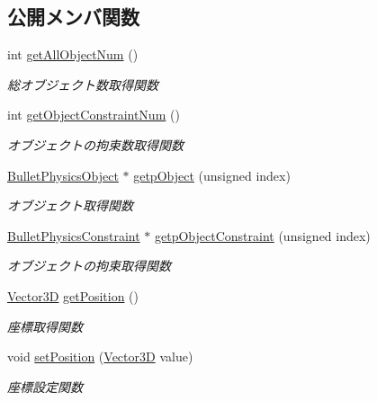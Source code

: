 \subsection*{公開メンバ関数}
\begin{DoxyCompactItemize}
\item 
int \mbox{\hyperlink{class_balloon_afff1be260962ed6e938601a7c08a17eb}{get\+All\+Object\+Num}} ()
\begin{DoxyCompactList}\small\item\em 総オブジェクト数取得関数 \end{DoxyCompactList}\item 
int \mbox{\hyperlink{class_balloon_ae36b5f71bde6e84037f200443774bd3a}{get\+Object\+Constraint\+Num}} ()
\begin{DoxyCompactList}\small\item\em オブジェクトの拘束数取得関数 \end{DoxyCompactList}\item 
\mbox{\hyperlink{class_bullet_physics_object}{Bullet\+Physics\+Object}} $\ast$ \mbox{\hyperlink{class_balloon_a24f6da4e76b5f174e3bf7598d832ffc0}{getp\+Object}} (unsigned index)
\begin{DoxyCompactList}\small\item\em オブジェクト取得関数 \end{DoxyCompactList}\item 
\mbox{\hyperlink{class_bullet_physics_constraint}{Bullet\+Physics\+Constraint}} $\ast$ \mbox{\hyperlink{class_balloon_afe165a4c82a8d5797bd21762ffbb2c64}{getp\+Object\+Constraint}} (unsigned index)
\begin{DoxyCompactList}\small\item\em オブジェクトの拘束取得関数 \end{DoxyCompactList}\item 
\mbox{\hyperlink{class_vector3_d}{Vector3D}} \mbox{\hyperlink{class_balloon_a1e262c3e11e1bf76e86d5e7c57bb4438}{get\+Position}} ()
\begin{DoxyCompactList}\small\item\em 座標取得関数 \end{DoxyCompactList}\item 
void \mbox{\hyperlink{class_balloon_a49a709cca0e96d1f00c8f88cd0d98d2f}{set\+Position}} (\mbox{\hyperlink{class_vector3_d}{Vector3D}} value)
\begin{DoxyCompactList}\small\item\em 座標設定関数 \end{DoxyCompactList}\item 

\end{DoxyCompactItemize}
